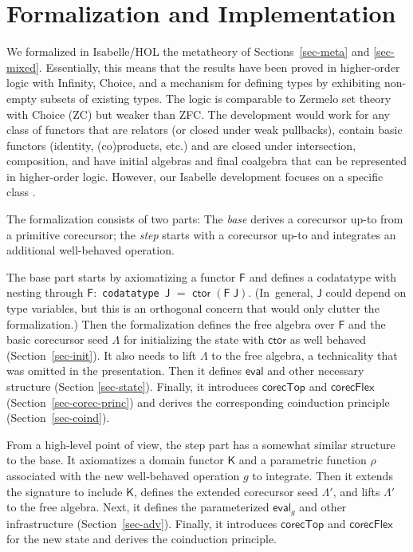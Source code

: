 \documentclass[preprint,draft]
{sigplanconf}
\newcommand\TC{\mathsf}
\newcommand\keyw[1]{\texttt{#1}}
\newcommand{\<}{\langle}
\renewcommand{\>}{\rangle}
\renewcommand{\l}{\Lambda}
\newcommand{\ctor}{{{\mathsf{ctor}}}}
\newcommand{\eval}{{{\mathsf{eval}}}}
\newcommand\corecU{\mathsf{corecTop}}
\newcommand\corecUU{\mathsf{corecFlex}}
\newcommand{\F}{{\TC{F}}}
\newcommand{\J}{{\TC{J}}}
\newcommand{\K}{{\TC{K}}}
\begin{document}
\section{Formalization and Implementation}
\label{sec-for}

We formalized in Isabelle/HOL the metatheory of Sections~\ref{sec-meta} and \ref{sec-mixed}.
Essentially, this means that the results have been proved
in higher-order logic
with Infinity, Choice, and a mechanism for defining
types by exhibiting non-empty subsets of existing types. The logic is
comparable to Zermelo set theory with Choice (ZC) but weaker than ZFC.
The development would work for any class of functors that are relators
(or closed under weak pullbacks), contain basic functors (identity,
(co)products, etc.) and are closed under intersection, composition, and
have initial algebras and final coalgebra that can be represented in higher-order logic.
However, our Isabelle development focuses on a specific class \cite{traytel-et-al-2012}.



The formalization consists of two parts: The \emph{base} derives a corecursor
up-to from a primitive corecursor; the \emph{step} starts with a corecursor
up-to and integrates an additional well-behaved operation.

The base part starts by axiomatizing a functor $\F$
and defines a codatatype with nesting through $\F$:\,
\keyw{codatatype} \,$\J$ $=$ $\ctor\;(\F\;\J)$.
(In~general, $\J$ could depend on type variables, but this is an orthogonal concern that would only clutter the formalization.)
Then the formalization defines the free algebra over $\F$ and
the basic corecursor seed $\l$ for initializing the state with
$\ctor$ as well behaved (Section~\ref{sec-init}). It also needs to lift
$\l$ to the free algebra, a technicality that was omitted in the
presentation. Then it defines $\eval$ and other necessary structure
(Section \ref{sec-state}). Finally, it introduces $\corecU$ and $\corecUU$
(Section~\ref{sec-corec-princ}) and derives the corresponding
coinduction principle (Section~\ref{sec-coind}).

From a high-level point of view, the step part has a somewhat similar structure to the base. It
axiomatizes a domain functor $\K$ and a parametric function $\rho$ associated
with the new well-behaved operation $g$ to integrate.
Then it extends the signature to include $\K$, defines the
extended corecursor seed $\l'$, and lifts $\l'$ to the free algebra.
Next, it defines the parameterized $\eval_g$ and other infrastructure
(Section~\ref{sec-adv}). Finally, it introduces $\corecU$ and $\corecUU$
for the new state and derives the coinduction principle.
\end{document}
